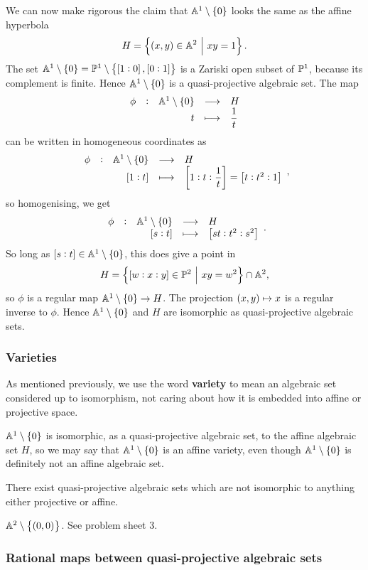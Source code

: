 \begin{example*}
We can now make rigorous the claim that $ \AA^1 \setminus \cbr{0} $ looks the same as the affine hyperbola
$$ H = \cbr{\br{x, y} \in \AA^2 \st xy = 1}. $$
The set $ \AA^1 \setminus \cbr{0} = \PP^1 \setminus \cbr{\sbr{1 : 0}, \sbr{0 : 1}} $ is a Zariski open subset of $ \mathbb{P}^1 $, because its complement is finite. Hence $ \AA^1 \setminus \cbr{0} $ is a quasi-projective algebraic set. The map
$$ \function[\phi]{\AA^1 \setminus \cbr{0}}{H}{t}{\dfrac{1}{t}} $$
can be written in homogeneous coordinates as
$$ \function[\phi]{\AA^1 \setminus \cbr{0}}{H}{\sbr{1 : t}}{\sbr{1 : t : \dfrac{1}{t}} = \sbr{t : t^2 : 1}}, $$
so homogenising, we get
$$ \function[\phi]{\AA^1 \setminus \cbr{0}}{H}{\sbr{s : t}}{\sbr{st : t^2 : s^2}}. $$
So long as $ \sbr{s : t} \in \AA^1 \setminus \cbr{0} $, this does give a point in
$$ H = \cbr{\sbr{w : x : y} \in \PP^2 \st xy = w^2} \cap \AA^2, $$
so $ \phi $ is a regular map $ \AA^1 \setminus \cbr{0} \to H $. The projection $ \br{x, y} \mapsto x $ is a regular inverse to $ \phi $. Hence $ \AA^1 \setminus \cbr{0} $ and $ H $ are isomorphic as quasi-projective algebraic sets.
\end{example*}

\subsubsection{Varieties}

As mentioned previously, we use the word \textbf{variety} to mean an algebraic set considered up to isomorphism, not caring about how it is embedded into affine or projective space.

\begin{example*}
$ \AA^1 \setminus \cbr{0} $ is isomorphic, as a quasi-projective algebraic set, to the affine algebraic set $ H $, so we may say that $ \AA^1 \setminus \cbr{0} $ is an affine variety, even though $ \AA^1 \setminus \cbr{0} $ is definitely not an affine algebraic set.
\end{example*}

There exist quasi-projective algebraic sets which are not isomorphic to anything either projective or affine.

\begin{example*}
$ \AA^2 \setminus \cbr{\br{0, 0}} $. See problem sheet $ 3 $.
\end{example*}

\subsubsection{Rational maps between quasi-projective algebraic sets}

